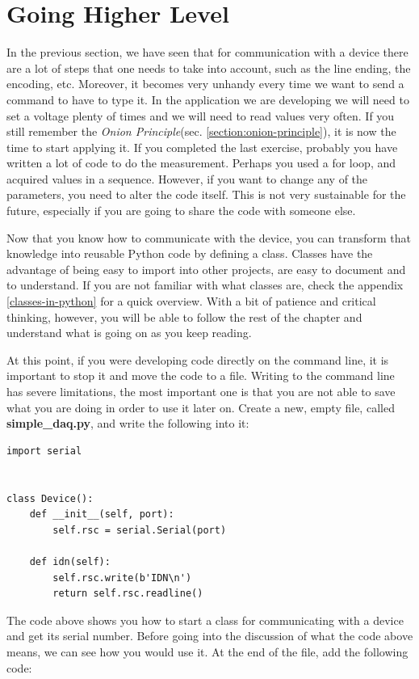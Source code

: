 \section{Going Higher Level}\label{going-higherlevel}
In the previous section, we have seen that for communication with a device there are a lot of
steps that one needs to take into account, such as the
line ending, the encoding, etc. Moreover, it becomes very unhandy every time we want
to send a command to have to type it. In the application we are developing we will need to set a voltage plenty of times and we will need to read values very often. If you still remember the \emph{Onion
Principle}(sec. \ref{section:onion-principle}), it is now the time to start applying it. 
If you completed the last exercise, probably you have
written a lot of code to do the measurement. Perhaps you used a for loop, and acquired values in a sequence. However, if you want to change any of the parameters, you need to alter the code itself. This is not very
sustainable for the future, especially if you are going to share the
code with someone else. 

Now that you know how to communicate with the device, you can transform
that knowledge into reusable Python code by defining a class. Classes
have the advantage of being easy to import into other projects, are easy
to document and to understand. If you are not familiar with what classes are, check the appendix \ref{classes-in-python} for a quick overview. With a bit of patience and critical thinking, however, you will be able to follow the rest of the chapter and understand what is going on as you keep reading. 

At this point, if you were developing code directly on the command line, it is important to stop it and move the code to a file. Writing to the command line has severe limitations, the most important one is that you are not able to save what you are doing in order to use it later on. Create a new, empty file, called \textbf{simple\_daq.py}, and write the following into it:

\begin{verbatim}
import serial


class Device():
    def __init__(self, port):
        self.rsc = serial.Serial(port)

    def idn(self):
        self.rsc.write(b'IDN\n')
        return self.rsc.readline()
\end{verbatim}

The code above shows you how to start a class for communicating with
a device and get its serial number. Before going into the discussion of what the code above means, we can see how you would use it. At the end of the file, add the following code: 

